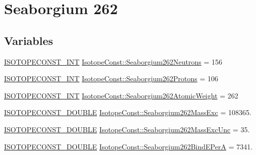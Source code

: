 \hypertarget{group___isotope_const-_seaborgium-_sg262}{}\section{Seaborgium 262}
\label{group___isotope_const-_seaborgium-_sg262}
\subsection*{Variables}
\begin{DoxyCompactItemize}
\item 
\mbox{\hyperlink{group___isotope_const-_macros_ga5f18360b3e99483a35c32d789e62621c}{I\+S\+O\+T\+O\+P\+E\+C\+O\+N\+S\+T\+\_\+\+I\+NT}} \mbox{\hyperlink{group___isotope_const-_seaborgium-_sg262_gad24f7c671af17a77bb6c91e23f6f8069}{Isotope\+Const\+::\+Seaborgium262\+Neutrons}} = 156
\item 
\mbox{\hyperlink{group___isotope_const-_macros_ga5f18360b3e99483a35c32d789e62621c}{I\+S\+O\+T\+O\+P\+E\+C\+O\+N\+S\+T\+\_\+\+I\+NT}} \mbox{\hyperlink{group___isotope_const-_seaborgium-_sg262_ga942ecfa622f909b8076a6a10569787eb}{Isotope\+Const\+::\+Seaborgium262\+Protons}} = 106
\item 
\mbox{\hyperlink{group___isotope_const-_macros_ga5f18360b3e99483a35c32d789e62621c}{I\+S\+O\+T\+O\+P\+E\+C\+O\+N\+S\+T\+\_\+\+I\+NT}} \mbox{\hyperlink{group___isotope_const-_seaborgium-_sg262_gab06f6514b8a40fc2b538eda1022314d3}{Isotope\+Const\+::\+Seaborgium262\+Atomic\+Weight}} = 262
\item 
\mbox{\hyperlink{group___isotope_const-_macros_ga8f45a7272ce02c0b4c65c44636ed719a}{I\+S\+O\+T\+O\+P\+E\+C\+O\+N\+S\+T\+\_\+\+D\+O\+U\+B\+LE}} \mbox{\hyperlink{group___isotope_const-_seaborgium-_sg262_gacf8d6505421f96358959dbe4d8e152d7}{Isotope\+Const\+::\+Seaborgium262\+Mass\+Exc}} = 108365.
\item 
\mbox{\hyperlink{group___isotope_const-_macros_ga8f45a7272ce02c0b4c65c44636ed719a}{I\+S\+O\+T\+O\+P\+E\+C\+O\+N\+S\+T\+\_\+\+D\+O\+U\+B\+LE}} \mbox{\hyperlink{group___isotope_const-_seaborgium-_sg262_ga2c44b7972e111487461f56392665bece}{Isotope\+Const\+::\+Seaborgium262\+Mass\+Exc\+Unc}} = 35.
\item 
\mbox{\hyperlink{group___isotope_const-_macros_ga8f45a7272ce02c0b4c65c44636ed719a}{I\+S\+O\+T\+O\+P\+E\+C\+O\+N\+S\+T\+\_\+\+D\+O\+U\+B\+LE}} \mbox{\hyperlink{group___isotope_const-_seaborgium-_sg262_ga3079cd9537535316652ea0b7ba8877ec}{Isotope\+Const\+::\+Seaborgium262\+Bind\+E\+PerA}} = 7341.

\end{DoxyCompactItemize}
